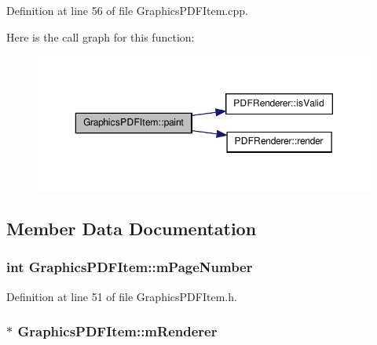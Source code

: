 Definition at line 56 of file Graphics\-P\-D\-F\-Item.\-cpp.



Here is the call graph for this function\-:
\nopagebreak
\begin{figure}[H]
\begin{center}
\leavevmode
\includegraphics[width=350pt]{d9/d97/class_graphics_p_d_f_item_a8db7a0767ad2778f3e07608b704988cb_cgraph}
\end{center}
\end{figure}




\subsection{Member Data Documentation}
\hypertarget{class_graphics_p_d_f_item_a7241c7fc6a0ac3459156c1678c4ecb93}{
\subsubsection[{m\-Page\-Number}]{\setlength{\rightskip}{0pt plus 5cm}int Graphics\-P\-D\-F\-Item\-::m\-Page\-Number\hspace{0.3cm}{\ttfamily [protected]}}}\label{d9/d97/class_graphics_p_d_f_item_a7241c7fc6a0ac3459156c1678c4ecb93}


Definition at line 51 of file Graphics\-P\-D\-F\-Item.\-h.

\hypertarget{class_graphics_p_d_f_item_a515a4f7bc6472e2f74c403d5ce2c15d9}{
\subsubsection[{m\-Renderer}]{$\ast$ Graphics\-P\-D\-F\-Item\-::m\-Renderer\hspace{0.3cm}{\ttfamily [protected]}}}\label{d9/d97/class_graphics_p_d_f_item_a515a4f7bc6472e2f74c403d5ce2c15d9}



